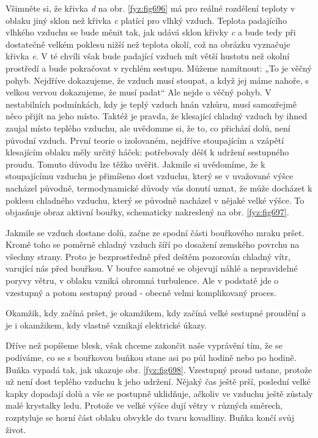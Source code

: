     Všimněte si, že křivka \emph{d} na obr. \ref{fyz:fig696} má pro reálné rozdělení teploty v
    oblaku jiný sklon než křivka \emph{c} platící pro vlhký vzduch. Teplota padajícího vlhkého
    vzduchu se bude měnit tak, jak udává sklon křivky \emph{c} a bude tedy při dostatečně velkém
    poklesu nižší než teplota okolí, což na obrázku vyznačuje křivka \emph{e}. V té chvíli však
    bude padající vzduch mít větší hustotu než okolní prostředí a bude pokračovat v rychlém
    sestupu. Můžeme namítnout: „To je věčný pohyb. Nejdříve dokazujeme, že vzduch musí stoupat, a
    když jej máme nahoře, s velkou vervou dokazujeme, že musí padat“ Ale nejde o věčný pohyb. V
    nestabilních podmínkách, kdy je teplý vzduch hnán vzhůru, musí samozřejmě něco přijít na jeho
    místo. Taktéž je pravda, že klesající chladný vzduch by ihned zaujal místo teplého vzduchu,
    ale uvědomme si, že to, co přichází dolů, není původní vzduch. První teorie o izolovaném,
    nejdříve stoupajícím a vzápětí klesajícím oblaku měly určitý háček: potřebovaly déšť k udržení
    sestupného proudu. Tomuto důvodu lze těžko uvěřit. Jakmile si uvědomíme, že k stoupajícímu
    vzduchu je přimíšeno dost vzduchu, který se v uvažované výšce nacházel původně, termodynamické
    důvody vás donutí uznat, že může docházet k poklesu chladného vzduchu, který se původně
    nacházel v nějaké velké výšce. To objasňuje obraz aktivní bouřky, schematicky nakreslený na
    obr. \ref{fyz:fig697}.

    Jakmile se vzduch dostane dolů, začne ze spodní části bouřkového mraku pršet. Kromě toho se
    poměrně chladný vzduch šíří po dosažení zemského povrchu na všechny strany. Proto je
    bezprostředně před deštěm pozorován chladný vítr, varující nás před bouřkou. V bouřce samotné
    se objevují náhlé a nepravidelné poryvy větru, v oblaku vzniká ohromná turbulence. Ale v
    podstatě jde o vzestupný a potom sestupný proud - obecně velmi komplikovaný proces.

    Okamžik, kdy začíná pršet, je okamžikem, kdy začíná velké sestupné proudění a je i okamžikem,
    kdy vlastně vznikají elektrické úkazy.

    Dříve než popíšeme blesk, však chceme zakončit naše vyprávění tím, že se podíváme, co se s
    bouřkovou buňkou stane asi po půl hodině nebo po hodině. Buňka vypadá tak, jak ukazuje obr.
    \ref{fyz:fig698}. Vzestupný proud ustane, protože už není dost teplého vzduchu k jeho udržení.
    Nějaký čas ještě prší, poslední velké kapky dopadají dolů a vše se postupně uklidňuje, ačkoliv
    ve vzduchu ještě zůstaly malé krystalky ledu. Protože ve velké výšce dují větry v různých
    směrech, rozptyluje se horní část oblaku obvykle do tvaru kovadliny. Buňka končí svůj život.
  
